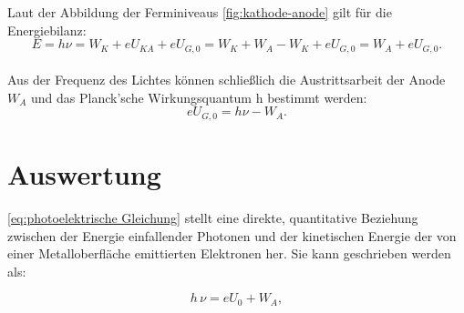 Laut der Abbildung der Ferminiveaus \ref{fig:kathode-anode} 
gilt für die Energiebilanz:
\begin{equation}
    E = h\nu = W_K + eU_{KA} + eU_{G,0} 
    = W_K + W_A - W_K + eU_{G,0} 
    = W_A + eU_{G,0}.
\end{equation}\\
Aus der Frequenz des Lichtes können 
schließlich
die Austrittsarbeit der Anode $W_A$ und 
das Planck’sche Wirkungsquantum h bestimmt 
werden:
\begin{equation}
    eU_{G,0} = h\nu - W_A.
    \label{eq:photoelektrische Gleichung}
\end{equation}


\section{Auswertung}
\cref{eq:photoelektrische Gleichung} stellt eine direkte, quantitative Beziehung zwischen der Energie einfallender Photonen und der kinetischen Energie der von einer Metalloberfläche emittierten Elektronen her. Sie kann geschrieben werden als:

\begin{equation}
    h\,\nu = e U_{0} + W_{A},
\end{equation}


